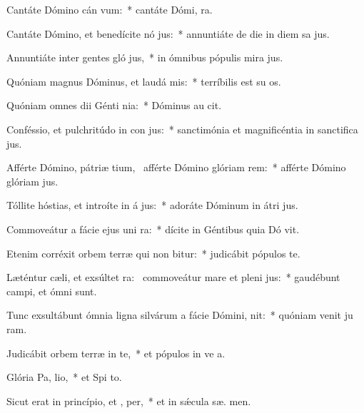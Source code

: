 \item Cantáte Dómino cán vum:~* cantáte Dómi,  ra.
\item Cantáte Dómino, et benedícite nó jus:~* annuntiáte de die in diem sa jus.
\item Annuntiáte inter gentes gló jus,~* in ómnibus pópulis mira jus.
\item Quóniam magnus Dóminus, et laudá mis:~* terríbilis est su  os.
\item Quóniam omnes dii Génti nia:~* Dóminus au  cit.
\item Conféssio, et pulchritúdo in con jus:~* sanctimónia et magnificéntia in sanctifica jus.
\item Afférte Dómino, pátriæ tium,~\pscross{} afférte Dómino glóriam  rem:~* afférte Dómino glóriam  jus.
\item Tóllite hóstias, et introíte in á jus:~* adoráte Dóminum in átri  jus.
\item Commoveátur a fácie ejus uni ra:~* dícite in Géntibus quia Dó vit.
\item Etenim corréxit orbem terræ qui non bitur:~* judicábit pópulos  te.
\item Læténtur cæli, et exsúltet ra:~\pscross{} commoveátur mare et pleni jus:~* gaudébunt campi, et ómni    sunt.
\item Tunc exsultábunt ómnia ligna silvárum a fácie Dómini,  nit:~* quóniam venit ju ram.
\item Judicábit orbem terræ in te,~* et pópulos in ve a.
\item Glória Pa,  lio,~* et Spi to.
\item Sicut erat in princípio, et ,  per,~* et in sǽcula sæ. men.
